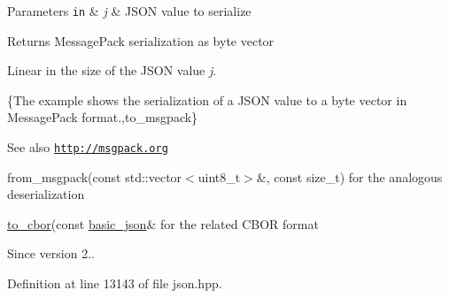 \begin{DoxyParams}[1]{Parameters}
\mbox{\tt in}  & {\em j} & J\+S\+ON value to serialize \\
\hline
\end{DoxyParams}
\begin{DoxyReturn}{Returns}
Message\+Pack serialization as byte vector
\end{DoxyReturn}
Linear in the size of the J\+S\+ON value {\itshape j}.

\{The example shows the serialization of a J\+S\+ON value to a byte vector in Message\+Pack format.,to\+\_\+msgpack\}

\begin{DoxySeeAlso}{See also}
\href{http://msgpack.org}{\tt http\+://msgpack.\+org} 

from\+\_\+msgpack(const std\+::vector$<$uint8\+\_\+t$>$\&, const size\+\_\+t) for the analogous deserialization 

\hyperlink{classnlohmann_1_1basic__json_a2566783e190dec524bf3445b322873b8}{to\+\_\+cbor}(const \hyperlink{classnlohmann_1_1basic__json}{basic\+\_\+json}\& for the related C\+B\+OR format
\end{DoxySeeAlso}
\begin{DoxySince}{Since}
version 2.. 
\end{DoxySince}


Definition at line 13143 of file json.\+hpp.

